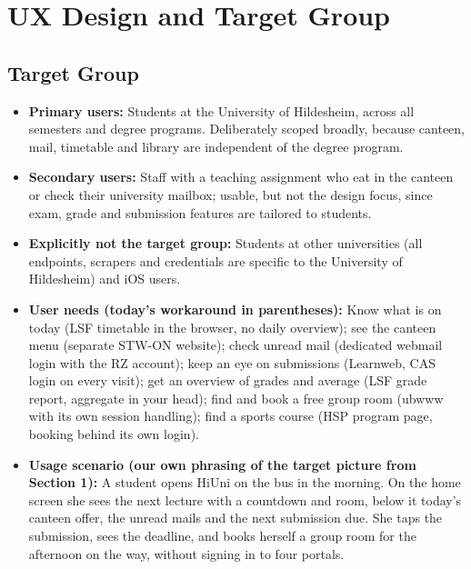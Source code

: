 \documentclass{msereport}
\begin{document}
\section{UX Design and Target Group}

\subsection{Target Group}

\begin{itemize}
  \item \textbf{Primary users:} Students at the University of Hildesheim, across
        all semesters and degree programs. Deliberately scoped broadly, because
        canteen, mail, timetable and library are independent of the degree
        program.
  \item \textbf{Secondary users:} Staff with a teaching assignment who eat in
        the canteen or check their university mailbox; usable, but not the
        design focus, since exam, grade and submission features are tailored to
        students.
  \item \textbf{Explicitly not the target group:} Students at other
        universities (all endpoints, scrapers and credentials are specific to
        the University of Hildesheim) and iOS users.
  \item \textbf{User needs (today's workaround in parentheses):} Know what is on
        today (LSF timetable in the browser, no daily overview); see the canteen
        menu (separate STW-ON website); check unread mail (dedicated webmail
        login with the RZ account); keep an eye on submissions (Learnweb, CAS
        login on every visit); get an overview of grades and average (LSF grade
        report, aggregate in your head); find and book a free group room (ubwww
        with its own session handling); find a sports course (HSP program page,
        booking behind its own login).
  \item \textbf{Usage scenario (our own phrasing of the target picture from
        Section 1):} A student opens HiUni on the bus in the morning. On the
        home screen she sees the next lecture with a countdown and room, below
        it today's canteen offer, the unread mails and the next submission due.
        She taps the submission, sees the deadline, and books herself a group
        room for the afternoon on the way, without signing in to four portals.
\end{itemize}
\end{document}
